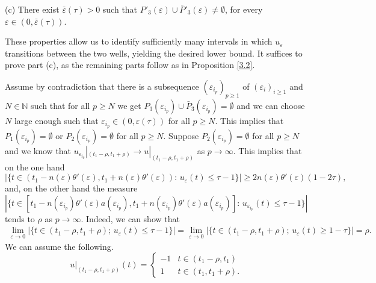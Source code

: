\documentclass[12pt]{article}
\newcommand{\N}{\mathbb{N}}
\numberwithin{equation}{section}
\def\e{\varepsilon}
\def\N{\mathbb N}
\begin{document}
\smallskip

\noindent (c) There exist $\bar{\varepsilon}(\tau)>0$ such that
$P'_{3}(\varepsilon)\cup \bar{P}'_{3}(\varepsilon)\neq\emptyset$,
for every $\varepsilon\in(0,\bar{\varepsilon}(\tau))$. 

\bigskip

These properties allow us to identify sufficiently many intervals in which $u_\varepsilon$ transitions between the two wells, yielding the desired lower bound. It suffices to prove part (c), as the remaining parts follow as in Proposition \ref{3.2}.

 Assume by contradiction that there is a subsequence $(\varepsilon_{i_{p}})_{p\ge1}$ of $(\varepsilon_{i})_{i\ge1}$ and $N\in\N$ such that for all $p\ge N$ we get $P_{3}(\varepsilon_{i_{p}})\cup \bar{P}_{3}(\varepsilon_{i_{p}})=\emptyset$ and we can choose $N$ large enough such that $\varepsilon_{i_{p}}\in(0,\varepsilon(\tau))$ for all $p\ge N$. This implies that $P_{1}(\varepsilon_{i_{p}})=\emptyset$ or $P_{2}(\varepsilon_{i_{p}})=\emptyset$ for all $p\ge N$. Suppose $P_{2}(\varepsilon_{i_{p}})=\emptyset$ for all $p\ge N$ and we know that $u_{\varepsilon_{i_{p}}}|_{(t_{1}-\rho,t_{1}+\rho)}\to u|_{(t_{1}-\rho,t_{1}+\rho)}$ as $p\to\infty$. This implies that on the one hand 
\begin{equation}\label{4.2}
    |\{t\in(t_{1}-n(\varepsilon)\theta'(\e) ,t_{1}+n(\varepsilon)\theta'(\e) ):\,u_{\varepsilon}(t)\le\tau-1\}|\ge2n(\varepsilon)\theta'(\e) (1-2\tau),
\end{equation}
and, on the other hand the measure 
$
|\{t\in[t_{1}-n(\varepsilon_{i_{p}}){\theta'(\e)a(\varepsilon_{i_{p}})},t_{1}+n(\varepsilon_{i_{p}}){\theta'(\e)a(\varepsilon_{i_{p}})}]:\,u_{\varepsilon_{i_{p}}}(t)\le\tau-1\}|$
tends to
$\rho$ as $p\to\infty$. 
Indeed, we can show that
\begin{multline*}
    \lim_{\varepsilon\to0}|\{t\in(t_{1}-\rho,t_{1}+\rho);\,u_{\varepsilon}(t)\le\tau-1\}|=\lim_{\varepsilon\to0}|\{t\in(t_{1}-\rho,t_{1}+\rho);\,u_{\varepsilon}(t)\ge1-\tau\}|=\rho.
\end{multline*}
We can assume the following. 
\begin{equation*}
    u|_{(t_{1}-\rho,t_{1}+\rho)}(t)=
    \begin{cases}
     -1 & t\in(t_{1}-\rho,t_{1})\\
     1& t\in(t_{1},t_{1}+\rho).
    \end{cases}
\end{equation*} 
\end{document}
